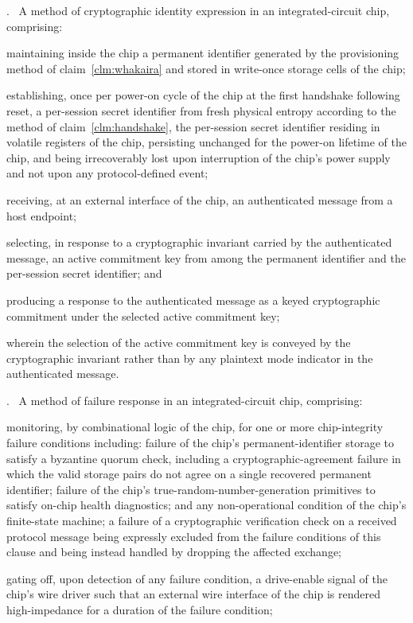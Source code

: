 \documentclass[12pt,letterpaper]{article}
\newcounter{claim}
\newcommand{\claim}[1]{\medskip\par\refstepcounter{claim}\noindent\arabic{claim}.~\label{clm:#1}\ignorespaces}
\newcommand{\clm}[1]{claim~\ref{clm:#1}}
\begin{document}
\claim{dichotomy} A method of cryptographic identity expression in an integrated-circuit chip, comprising:

maintaining inside the chip a permanent identifier generated by the provisioning method of \clm{whakaira} and stored in write-once storage cells of the chip;

establishing, once per power-on cycle of the chip at the first handshake following reset, a per-session secret identifier from fresh physical entropy according to the method of \clm{handshake}, the per-session secret identifier residing in volatile registers of the chip, persisting unchanged for the power-on lifetime of the chip, and being irrecoverably lost upon interruption of the chip's power supply and not upon any protocol-defined event;

receiving, at an external interface of the chip, an authenticated message from a host endpoint;

selecting, in response to a cryptographic invariant carried by the authenticated message, an active commitment key from among the permanent identifier and the per-session secret identifier; and

producing a response to the authenticated message as a keyed cryptographic commitment under the selected active commitment key;

wherein the selection of the active commitment key is conveyed by the cryptographic invariant rather than by any plaintext mode indicator in the authenticated message.

\claim{silentfail} A method of failure response in an integrated-circuit chip, comprising:

monitoring, by combinational logic of the chip, for one or more chip-integrity failure conditions including: failure of the chip's permanent-identifier storage to satisfy a byzantine quorum check, including a cryptographic-agreement failure in which the valid storage pairs do not agree on a single recovered permanent identifier; failure of the chip's true-random-number-generation primitives to satisfy on-chip health diagnostics; and any non-operational condition of the chip's finite-state machine; a failure of a cryptographic verification check on a received protocol message being expressly excluded from the failure conditions of this clause and being instead handled by dropping the affected exchange;

gating off, upon detection of any failure condition, a drive-enable signal of the chip's wire driver such that an external wire interface of the chip is rendered high-impedance for a duration of the failure condition;
\end{document}
